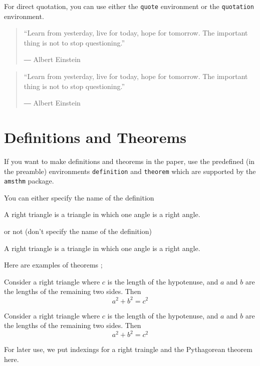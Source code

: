 For direct quotation, you can use either the \texttt{quote} environment or the \texttt{quotation} environment.
\begin{quote}
“Learn from yesterday, live for today, hope for tomorrow. The important thing is not to stop questioning.” \par
― Albert Einstein 
\end{quote}

\begin{quotation}
“Learn from yesterday, live for today, hope for tomorrow. The important thing is not to stop questioning.” \par
― Albert Einstein 
\end{quotation}

\section{Definitions and Theorems}

If you want to make definitions and theorems in the paper, use the predefined (in the preamble) environments \texttt{definition} and \texttt{theorem} which are supported by the \texttt{amsthm} package.

You can either specify the name of the definition
\begin{definition}
A right triangle is a triangle in which one angle is a right angle.
\end{definition}
or not (don't specify the name of the definition)
\begin{definition}
A right triangle is a triangle in which one angle is a right angle.
\end{definition}

Here are examples of theorems ;
\begin{theorem}
Consider a right triangle where \(c\) is the length of the hypotenuse, and \(a\) and \(b\) are the lengths of the remaining two sides.
Then
\begin{equation}
a^2+b^2=c^2
\end{equation}
\end{theorem}

\begin{theorem}
Consider a right triangle where \(c\) is the length of the hypotenuse, and \(a\) and \(b\) are the lengths of the remaining two sides.
Then
\begin{equation}
a^2+b^2=c^2
\end{equation}
\end{theorem}
For later use, we put indexings for a right traingle and the Pythagorean theorem here.

